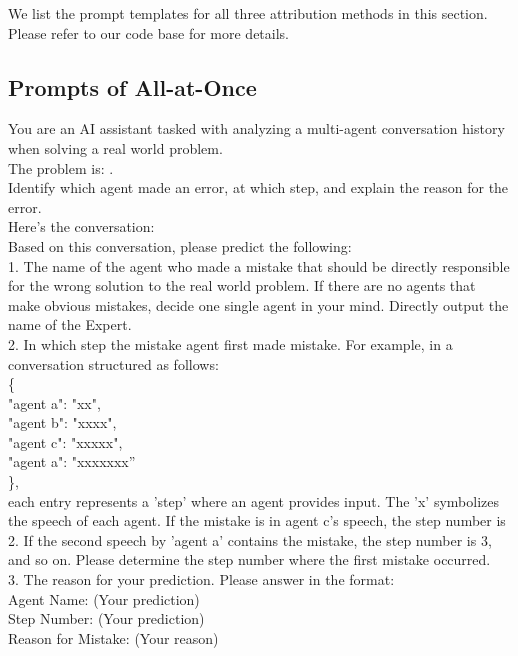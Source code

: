 We list the prompt templates for all three attribution methods in this section. Please refer to our code base for more details.


\subsection{Prompts of All-at-Once}


\begin{boxL}
You are an AI assistant tasked with analyzing a multi-agent conversation history when solving a real world problem. \\
The problem is:  .\\
Identify which agent made an error, at which step, and explain the reason for the error. \\
Here's the conversation: \\
Based on this conversation, please predict the following:\\
1. The name of the agent who made a mistake that should be directly responsible for the wrong solution to the real world problem. If there are no agents that make obvious mistakes, decide one single agent in your mind. Directly output the name of the Expert.\\
2. In which step the mistake agent first made mistake. For example, in a conversation structured as follows: \\
\{ \\"agent a": "xx", \\
    "agent b": "xxxx",\\
    "agent c": "xxxxx",\\
    "agent a": "xxxxxxx”\\\},    
\\
each entry represents a 'step' where an agent provides input. The 'x' symbolizes the speech of each agent. If the mistake is in agent c's speech, the step number is 2. If the second speech by 'agent a' contains the mistake, the step number is 3, and so on. Please determine the step number where the first mistake occurred.\\
3. The reason for your prediction. Please answer in the format: \\
Agent Name: (Your prediction) \\
Step Number: (Your prediction) \\
Reason for Mistake: (Your reason)
\end{boxL}


